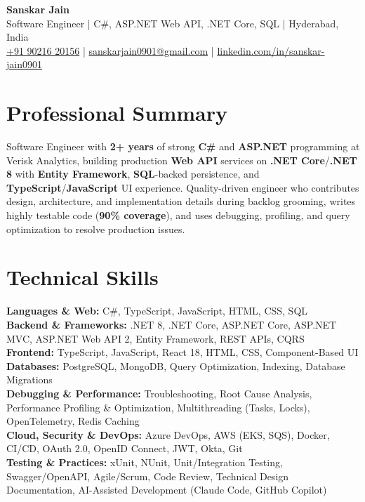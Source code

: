 \documentclass[a4paper,10pt]{article}
\begin{document}
\begin{center}
    {\LARGE \textbf{Sanskar Jain}} \\
    \vspace{2pt}
    Software Engineer \;|\; C\#, ASP.NET Web API, .NET Core, SQL \;|\; Hyderabad, India \\
    \href{tel:+919021620156}{+91 90216 20156} \;|\;
    \href{mailto:sanskarjain0901@gmail.com}{sanskarjain0901@gmail.com} \;|\;
    \href{https://www.linkedin.com/in/sanskar-jain0901/}{linkedin.com/in/sanskar-jain0901}
\end{center}

\section*{Professional Summary}
Software Engineer with \textbf{2+ years} of strong \textbf{C\#} and \textbf{ASP.NET} programming at Verisk Analytics, building production \textbf{Web API} services on \textbf{.NET Core}/\textbf{.NET 8} with \textbf{Entity Framework}, \textbf{SQL}-backed persistence, and \textbf{TypeScript}/\textbf{JavaScript} UI experience.
Quality-driven engineer who contributes design, architecture, and implementation details during backlog grooming, writes highly testable code (\textbf{90\% coverage}), and uses debugging, profiling, and query optimization to resolve production issues.

\section*{Technical Skills}
\begin{sloppypar}
\noindent
\textbf{Languages \& Web:} C\#, TypeScript, JavaScript, HTML, CSS, SQL \\
\textbf{Backend \& Frameworks:} .NET 8, .NET Core, ASP.NET Core, ASP.NET MVC, ASP.NET Web API 2, Entity Framework, REST APIs, CQRS \\
\textbf{Frontend:} TypeScript, JavaScript, React 18, HTML, CSS, Component-Based UI \\
\textbf{Databases:} PostgreSQL, MongoDB, Query Optimization, Indexing, Database Migrations \\
\textbf{Debugging \& Performance:} Troubleshooting, Root Cause Analysis, Performance Profiling \& Optimization, Multithreading (Tasks, Locks), OpenTelemetry, Redis Caching \\
\textbf{Cloud, Security \& DevOps:} Azure DevOps, AWS (EKS, SQS), Docker, CI/CD, OAuth 2.0, OpenID Connect, JWT, Okta, Git \\
\textbf{Testing \& Practices:} xUnit, NUnit, Unit/Integration Testing, Swagger/OpenAPI, Agile/Scrum, Code Review, Technical Design Documentation, AI-Assisted Development (Claude Code, GitHub Copilot)
\end{sloppypar}
\end{document}
